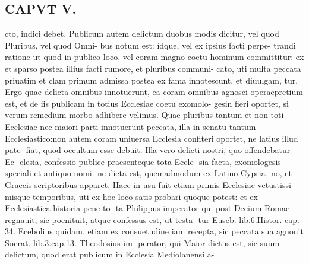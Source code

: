 \documentclass{article}
\begin{document}
\begin{pages}
\section*{CAPVT  V. }
\marginpar{[ p.52 ]}cto, indici debet. Publicum autem delictum duobus modis dicitur, vel quod Pluribus, vel quod Omni- bus notum est: ídque, vel ex ipsius facti perpe- trandi ratione ut quod in publico loco, vel coram magno coetu hominum committitur: ex et sparso postea illius facti rumore, et pluribus communi- cato, uti multa peccata priuatim et clam primum admissa postea ex fama innotescunt, et diuulgam, tur. Ergo quae delicta omnibus innotuerunt, ea coram omnibus agnosci operaepretium est, et de iis publicam in totius Ecclesiae coetu exomolo- gesin fieri oportet, si verum remedium morbo adhibere velimus. Quae pluribus tantum et non toti Ecclesiae nec maiori parti innotuerunt peccata, illa in senatu tantum Ecclesiastico:non autem coram uniuersa Ecclesia confiteri oportet, ne latius illud pate- fiat, quod occultum esse debuit. Illa vero delicti nostri, quo offendebatur Ec- clesia, confessio publice praesenteque tota Eccle- sia facta, exomologesis speciali et antiquo nomi- ne dicta est, quemadmodum ex Latino Cypria- no, et Graecis scriptoribus apparet. Haec in usu fuit etiam primis Ecclesiae vetustissi- misque temporibus, uti ex hoc loco satis probari quoque potest: et ex Ecclesiastica historia pene to- ta Philippus imperator qui post Decium Romae regnauit, sic poenituit, atque confessus est, ut testa- tur Euseb. lib.6.Histor. cap. 34. Ecebolius quidam, etiam ex consuetudine iam recepta, sic peccata sua agnouit Socrat. lib.3.cap.13. Theodosius im- perator, qui Maior dictus est, sic suum delictum, quod erat publicum in Ecclesia Mediolanensi a- 

\end{pages}
\end{document}
